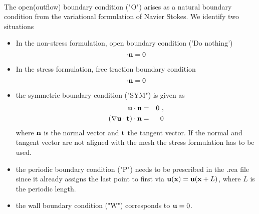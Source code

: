 \begin{comment}
\begin{table}
\begin{tabular}{ |l|l| }
   \hline
   Identifier & Description\\ \hline \hline
v  &      user defined Dirichlet velocity\\
t   &     user defined Dirichlet temperature\\
f    &    user defined flux\\
   \hline
\end{tabular}
\caption{User defined boundary conditions (flow velocity)}\label{tab:userBCf}
\end{table}
\end{comment}
\paragraph*{}
The open(outflow) boundary condition ("O") arises as a natural boundary condition from the variational formulation of Navier Stokes. We identify two situations
\begin{itemize}
\item In the non-stress formulation, open boundary condition ('Do nothing')
\begin{equation}
[-p\vect I + \nu(\nabla \vect u)]\cdot \vect n=0
\end{equation}
\item In the stress formulation, free traction boundary condition
\begin{equation}
[-p\vect I + \nu(\nabla \vect u+\nabla \vect u^T)]\cdot \vect n=0
\end{equation}

\item the symmetric boundary condition ("SYM") is given as
\begin{eqnarray}
\mathbf{u} \cdot \mathbf{n}&=&0\ ,\\
(\nabla \mathbf{u} \cdot \mathbf{t})\cdot \mathbf{n}&=&0
\end{eqnarray}
where $\mathbf{n}$ is the normal vector and $\mathbf{t}$ the tangent vector. If the normal and tangent vector are not aligned with the mesh the stress formulation has to be used.


\item the periodic boundary condition ("P") needs to be prescribed in the .rea file since it already assigns the last point to first via $\mathbf{u}(\mathbf{x})=\mathbf{u}(\mathbf{x} + L) $, where $L$ is the periodic length.

\item the wall boundary condition ("W") corresponds to $\mathbf{u}=0$.
\end{itemize}

